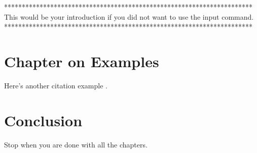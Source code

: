 \documentclass{TUT}
\begin{document}

\noindent
**********************************************************************\\
This would be your introduction if you did not want to use the input
command.\\
**********************************************************************\\




\chapter{Chapter on Examples}


Here's another citation example \cite{Chen-Gaffey2015}.


\chapter{Conclusion}
%

Stop when you are done with all the chapters.




%


\end{document}

